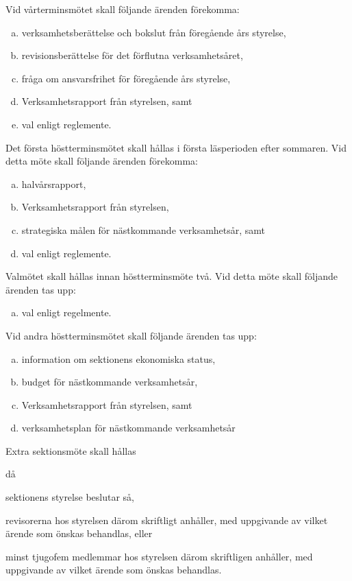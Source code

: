 \documentclass[stadgar]{dsekprotokoll}
\begin{document}
\begin{stadgeavsnitt}

Vid vårterminsmötet skall följande ärenden förekomma:
\begin{enumerate}[a)]
\item verksamhetsberättelse och bokslut från föregående års styrelse,
\item revisionsberättelse för det förflutna verksamhetsåret,
\item fråga om ansvarsfrihet för föregående års styrelse,
\item Verksamhetsrapport från styrelsen, samt
\item val enligt reglemente.
\end{enumerate}


Det första höstterminsmötet skall hållas i första läsperioden efter sommaren. Vid detta möte skall följande ärenden förekomma:
\begin{enumerate}[a)]
\item halvårsrapport,
\item Verksamhetsrapport från styrelsen,
\item strategiska målen för nästkommande verksamhetsår, samt
\item val enligt reglemente.
\end{enumerate}


Valmötet skall hållas innan höstterminsmöte två. Vid detta möte skall följande ärenden tas upp:
\begin{enumerate}[a)]
\item val enligt regelmente.
\end{enumerate}


Vid andra höstterminsmötet skall följande ärenden tas upp:
\begin{enumerate}[a)]
\item information om sektionens ekonomiska status,
\item budget för nästkommande verksamhetsår,
\item Verksamhetsrapport från styrelsen, samt
\item verksamhetsplan för nästkommande verksamhetsår
\end{enumerate}


Extra sektionsmöte skall hållas
\begin{fetlista}{då}
\item sektionens styrelse beslutar så,
\item revisorerna hos styrelsen därom skriftligt anhåller, med
  uppgivande av vilket ärende som önskas behandlas, eller
\item minst tjugofem medlemmar hos styrelsen därom skriftligen
  anhåller, med uppgivande av vilket ärende som önskas behandlas.
\end{fetlista}


\end{stadgeavsnitt}
\end{document}
